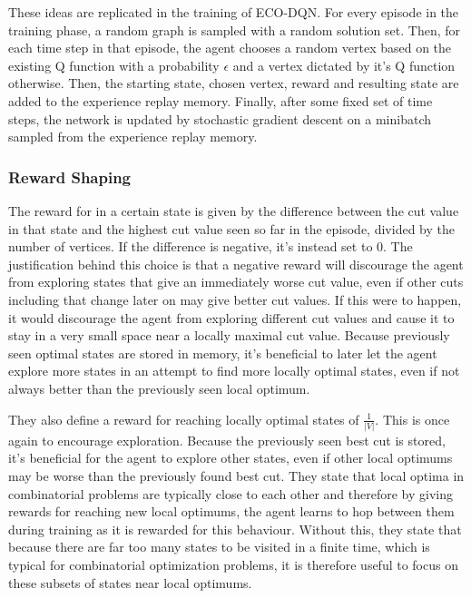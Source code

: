 \documentclass{article}
\begin{document}
These ideas are replicated in the training of ECO-DQN. For every episode in the training phase, a random graph is sampled with a random solution set. Then, for each time step in that episode, the agent chooses a random vertex based on the existing Q function with a probability $\epsilon$ and a vertex dictated by it's Q function otherwise. Then, the starting state, chosen vertex, reward and resulting state are added to the experience replay memory. Finally, after some fixed set of time steps, the network is updated by stochastic gradient descent on a minibatch sampled from the experience replay memory.

\subsubsection{Reward Shaping}

The reward for in a certain state is given by the difference between the cut value in that state and the highest cut value seen so far in the episode, divided by the number of vertices. If the difference is negative, it's instead set to 0. The justification behind this choice is that a negative reward will discourage the agent from exploring states that give an immediately worse cut value, even if other cuts including that change later on may give better cut values. If this were to happen, it would discourage the agent from exploring different cut values and cause it to stay in a very small space near a locally maximal cut value. Because previously seen optimal states are stored in memory, it's beneficial to later let the agent explore more states in an attempt to find more locally optimal states, even if not always better than the previously seen local optimum.

They also define a reward for reaching locally optimal states of $\frac{1}{|V|}$. This is once again to encourage exploration. Because the previously seen best cut is stored, it's beneficial for the agent to explore other states, even if other local optimums may be worse than the previously found best cut. They state that local optima in combinatorial problems are typically close to each other and therefore by giving rewards for reaching new local optimums, the agent learns to hop between them during training as it is rewarded for this behaviour. Without this, they state that because there are far too many states to be visited in a finite time, which is typical for combinatorial optimization problems, it is therefore useful to focus on these subsets of states near local optimums.
\end{document}
